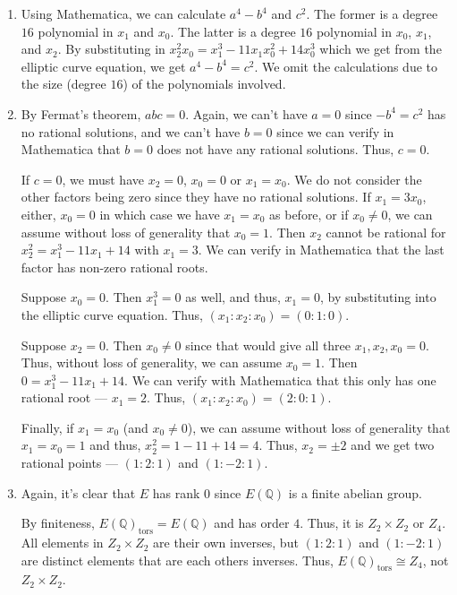 \documentclass[12 pt, letterpaper]{hmcpset}
\begin{document}
\begin{solution}
	\begin{enumerate}
		\item Using Mathematica, we can calculate $a^{4} - b^{4}$ and $c^{2}$. The former is a degree $16$ polynomial in $x_{1}$ and $x_{0}$. The latter is a degree $16$ polynomial in $x_{0}$, $x_{1}$, and $x_{2}$. By substituting in $x_{2}^{2} x_{0} = x_{1}^{3} - 11 x_{1} x_{0}^{2} + 14 x_{0}^{3}$ which we get from the elliptic curve equation, we get $a^{4} - b^{4} = c^{2}$. We omit the calculations due to the size (degree $16$) of the polynomials involved.
		\item By Fermat's theorem, $abc = 0$. Again, we can't have $a = 0$ since $- b^{4} = c^{2}$ has no rational solutions, and we can't have $b = 0$ since we can verify in Mathematica that $b = 0$ does not have any rational solutions. Thus, $c = 0$.

			If $c = 0$, we must have $x_{2} = 0$, $x_{0} = 0$ or $x_{1} = x_{0}$. We do not consider the other factors being zero since they have no rational solutions. If $x_{1} = 3 x_{0}$, either, $x_{0} = 0$ in which case we have  $x_{1} = x_{0}$ as before, or if $x_{0} \neq 0$, we can assume without loss of generality that $x_{0} = 1$. Then $x_{2}$ cannot be rational for $x_{2}^{2} = x_{1}^{3} - 11 x_{1} + 14$ with $x_{1} = 3$. We can verify in Mathematica that the last factor has non-zero rational roots.

			Suppose $x_{0} = 0$. Then $x_{1}^{3} = 0$ as well, and thus, $x_{1} = 0$, by substituting into the elliptic curve equation. Thus, $(x_{1} : x_{2} : x_{0}) = (0 : 1 : 0)$.

			Suppose $x_{2} = 0$. Then $x_{0} \neq 0$ since that would give all three $x_{1}, x_{2}, x_{0} = 0$. Thus, without loss of generality, we can assume $x_{0} = 1$. Then $0 = x_{1}^{3} - 11 x_{1} + 14$. We can verify with Mathematica that this only has one rational root --- $x_{1} = 2$. Thus, $(x_{1} : x_{2} : x_{0}) = (2 : 0 : 1)$.

			Finally, if $x_{1} = x_{0}$ (and $x_{0} \neq 0$), we can assume without loss of generality that $x_{1} = x_{0} = 1$ and thus, $x_{2}^{2} = 1 - 11 + 14 = 4$. Thus, $x_{2} = \pm 2$ and we get two rational points ---  $(1 : 2 : 1)$ and $(1 : -2 : 1)$.
		\item Again, it's clear that $E$ has rank $0$ since $E(\mathbb{Q})$ is a finite abelian group.

			By finiteness, $E(\mathbb{Q})_{\text{tors}} = E(\mathbb{Q})$ and has order $4$. Thus, it is $Z_{2} \times Z_{2}$ or $Z_{4}$. All elements in $Z_{2} \times Z_{2}$ are their own inverses, but $(1 : 2 : 1)$ and $(1 : -2 : 1)$ are distinct elements that are each others inverses. Thus, $E(\mathbb{Q})_{\text{tors}} \cong Z_{4}$, not $Z_{2} \times Z_{2}$.
	\end{enumerate}
\end{solution}
\end{document}
